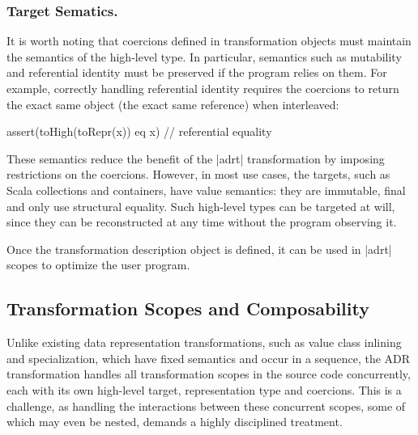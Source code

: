\subsubsection{Target Sematics.} It is worth noting that coercions defined in transformation objects must maintain the semantics of the high-level type. In particular, semantics such as mutability and referential identity must be preserved if the program relies on them. For example, correctly handling referential identity requires the coercions to return the exact same object (the exact same reference) when interleaved:

\begin{lstlisting-nobreak}
assert(toHigh(toRepr(x)) eq x) // referential equality
\end{lstlisting-nobreak}

These semantics reduce the benefit of the |adrt| transformation by imposing restrictions on the coercions. However, in most use cases, the targets, such as Scala collections and containers, have value semantics: they are immutable, final and only use structural equality. Such high-level types can be targeted at will, since they can be reconstructed at any time without the program observing it.

Once the transformation description object is defined, it can be used in |adrt| scopes to optimize the user program.



\subsection{Transformation Scopes and Composability}
\label{sec:ildl:scoped}

Unlike existing data representation transformations, such as value class inlining and specialization, which have fixed semantics and occur in a sequence, the ADR transformation handles all transformation scopes in the source code concurrently, each with its own high-level target, representation type and coercions. This is a challenge, as handling the interactions between these concurrent scopes, some of which may even be nested, demands a highly disciplined treatment.


